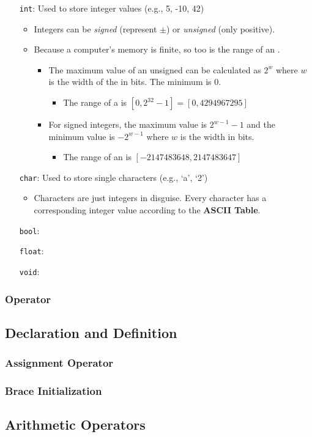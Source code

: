 \documentclass{article}
\begin{document}
\begin{itemize}
	\item[\textcolor{BurntOrange}{\texttt{int}}:] Used to store integer values (e.g., 5, -10, 42)
	\begin{itemize}
		\item Integers can be \textit{signed} (represent $\pm$) or \textit{unsigned} (only positive).		
		\item Because a computer's memory is finite, so too is the range of an .
		\begin{itemize}
			\item The maximum value of an unsigned  can be calculated as $2^w$ where $w$ is the width of the  in bits. The minimum is 0.
			\begin{itemize}
				\item The range of a  is $[0, 2^{32}-1]=[0, 4294967295]$
			\end{itemize}
			\item For signed integers, the maximum value is $2^{w-1}-1$ and the minimum value is $-2^{w-1}$ where $w$ is the width in bits.
			\begin{itemize}
				\item The range of an  is $[-2147483648, 2147483647]$
			\end{itemize}
		\end{itemize}
	\end{itemize}
	\item[\textcolor{BurntOrange}{\texttt{char}}:] Used to store single characters (e.g., `a', `2')
	\begin{itemize}
		\item Characters are just integers in disguise. Every character has a corresponding integer value according to the \textbf{ASCII Table}.
	\end{itemize}
	\item[\textcolor{BurntOrange}{\texttt{bool}}:] 
	\item[\textcolor{BurntOrange}{\texttt{float}}:] 
	\item[\textcolor{BurntOrange}{\texttt{void}}:] 
\end{itemize}

\subsubsection{ Operator}

\subsection{Declaration and Definition}

\subsubsection{Assignment Operator \inlinecpp{=}}

\subsubsection{Brace Initialization \inlinecpp{\{\}}}

\subsection{Arithmetic Operators}
\end{document}
